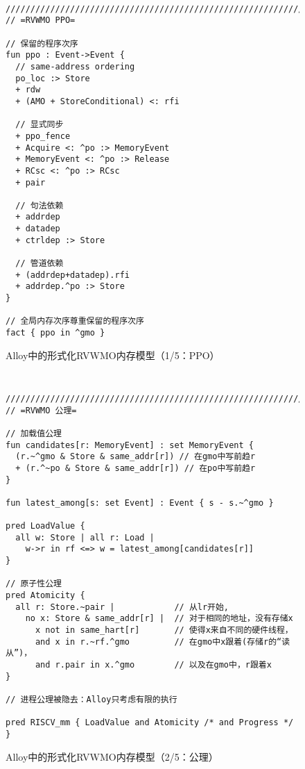 \begin{figure}[h!]
  {
  \tt\bfseries\centering\footnotesize
  \begin{lstlisting}
////////////////////////////////////////////////////////////////////////////////
// =RVWMO PPO=

// 保留的程序次序
fun ppo : Event->Event {
  // same-address ordering
  po_loc :> Store
  + rdw
  + (AMO + StoreConditional) <: rfi

  // 显式同步
  + ppo_fence
  + Acquire <: ^po :> MemoryEvent
  + MemoryEvent <: ^po :> Release
  + RCsc <: ^po :> RCsc
  + pair

  // 句法依赖
  + addrdep
  + datadep
  + ctrldep :> Store

  // 管道依赖
  + (addrdep+datadep).rfi
  + addrdep.^po :> Store
}

// 全局内存次序尊重保留的程序次序
fact { ppo in ^gmo }
\end{lstlisting}}
  \caption{Alloy中的形式化RVWMO内存模型（1/5：PPO）  
  }
  \label{fig:alloy1}
\end{figure}
\begin{figure}[h!]
  {
  \tt\bfseries\centering\footnotesize
  \begin{lstlisting}
////////////////////////////////////////////////////////////////////////////////
// =RVWMO 公理=

// 加载值公理
fun candidates[r: MemoryEvent] : set MemoryEvent {
  (r.~^gmo & Store & same_addr[r]) // 在gmo中写前趋r
  + (r.^~po & Store & same_addr[r]) // 在po中写前趋r
}

fun latest_among[s: set Event] : Event { s - s.~^gmo }

pred LoadValue {
  all w: Store | all r: Load |
    w->r in rf <=> w = latest_among[candidates[r]]
}

// 原子性公理
pred Atomicity {
  all r: Store.~pair |            // 从lr开始,
    no x: Store & same_addr[r] |  // 对于相同的地址，没有存储x
      x not in same_hart[r]       // 使得x来自不同的硬件线程，
      and x in r.~rf.^gmo         // 在gmo中x跟着(存储r的“读从”)，
      and r.pair in x.^gmo        // 以及在gmo中，r跟着x
}

// 进程公理被隐去：Alloy只考虑有限的执行

pred RISCV_mm { LoadValue and Atomicity /* and Progress */ }

\end{lstlisting}}
  \caption{Alloy中的形式化RVWMO内存模型（2/5：公理）
    }
  \label{fig:alloy2}
\end{figure}
